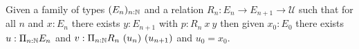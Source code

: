 \begin{axiom}\label{axDependentChoice}
  Given a family of types $(E_n)_{n:\mathbb{N}}$ and 
  a relation 
  $R_n:E_n\rightarrow E_{n+1}\rightarrow {\mathcal U}$ such that
  for all $n$ and $x:E_n$ there exists $y:E_{n+1}$ with $p:R_n~x~y$ 
  then given $x_0:E_0$ there exists
  $u:\Pi_{n:\mathbb{N}}E_n$ and $v:\Pi_{n:\mathbb{N}}R_n~(u_n)~(u_{n+1})$ and $u_0 = x_0$.
\end{axiom}
